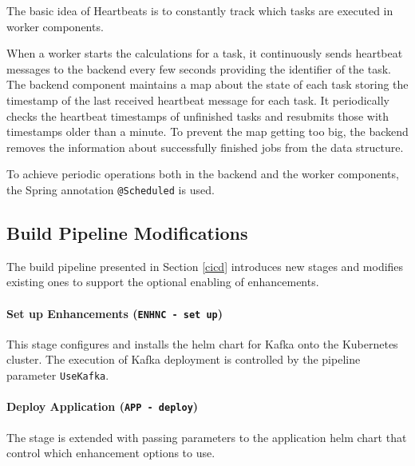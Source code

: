 The basic idea of Heartbeats is to constantly track which tasks are executed in worker components.

When a worker starts the calculations for a task, it continuously sends heartbeat messages to the backend every few seconds providing the identifier of the task. The backend component maintains a map about the state of each task storing the timestamp of the last received heartbeat message for each task. It periodically checks the heartbeat timestamps of unfinished tasks and resubmits those with timestamps older than a minute. To prevent the map getting too big, the backend removes the information about successfully finished jobs from the data structure.

To achieve periodic operations both in the backend and the worker components, the Spring annotation \texttt{@Scheduled} is used.


\subsection{Build Pipeline Modifications} \label{cicd-modifications}

The build pipeline presented in Section \ref{cicd} introduces new stages and modifies existing ones to support the optional enabling of enhancements.

\paragraph{Set up Enhancements (\texttt{ENHNC - set up})} This stage configures and installs the helm chart for Kafka onto the Kubernetes cluster. The execution of Kafka deployment is controlled by the pipeline parameter \texttt{UseKafka}.

\paragraph{Deploy Application (\texttt{APP - deploy})} The stage is extended with passing parameters to the application helm chart that control which enhancement options to use.




